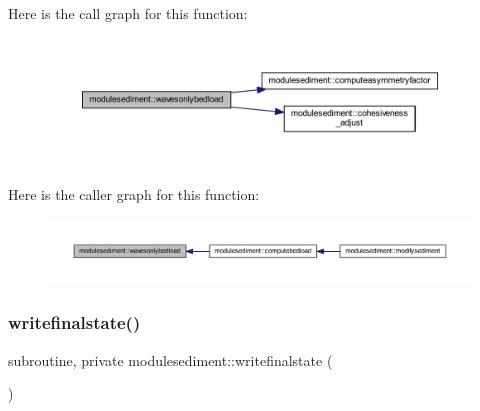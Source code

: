 Here is the call graph for this function\+:\nopagebreak
\begin{figure}[H]
\begin{center}
\leavevmode
\includegraphics[width=350pt]{namespacemodulesediment_ab75ac0182e2b11a8063dbb8027fa8d19_cgraph}
\end{center}
\end{figure}
Here is the caller graph for this function\+:\nopagebreak
\begin{figure}[H]
\begin{center}
\leavevmode
\includegraphics[width=350pt]{namespacemodulesediment_ab75ac0182e2b11a8063dbb8027fa8d19_icgraph}
\end{center}
\end{figure}
\mbox{\label{namespacemodulesediment_a1f674dbab21e666bea43953621c4cce3}} 
\subsubsection{\texorpdfstring{writefinalstate()}{writefinalstate()}}
{\footnotesize\ttfamily subroutine, private modulesediment\+::writefinalstate (\begin{DoxyParamCaption}{ }\end{DoxyParamCaption})\hspace{0.3cm}{\ttfamily [private]}}

